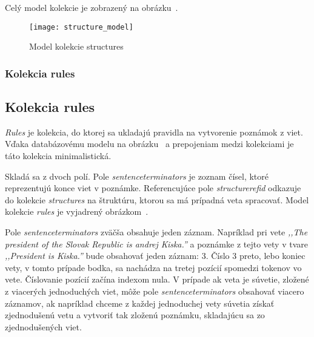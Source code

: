 Celý model kolekcie je zobrazený na obrázku~.

\begin{figure}[H]
	\begin{center}\texttt{[image: structure\_model]}\end{center}
	\caption[Model kolekcie structures]{Model kolekcie structures}\label{fig:structures_collection_model}
\end{figure}

%
%
{
	\subsubsection{Kolekcia rules}
}
{
	\subsection{Kolekcia rules}
}
\label{subsubsection:collection_rules}
\textit{Rules} je kolekcia, do ktorej sa ukladajú pravidla na vytvorenie poznámok z viet. Vďaka databázovému modelu na obrázku~ a prepojeniam medzi kolekciami je táto kolekcia minimalistická.

Skladá sa z dvoch polí. Pole \textit{sentence\textunderscore terminators} je zoznam čísel, ktoré reprezentujú konce viet v poznámke. Referencujúce pole \textit{structure\textunderscore ref\textunderscore id} odkazuje do kolekcie \textit{structures} na štruktúru, ktorou sa má prípadná veta spracovať. Model kolekcie \textit{rules} je vyjadrený obrázkom~.

Pole \textit{sentence\textunderscore terminators} zväčša obsahuje jeden záznam. Napríklad pri vete \textit{,,The president of the Slovak Republic is andrej Kiska.''} a poznámke z tejto vety v tvare \textit{,,President is Kiska.''} bude obsahovať jeden záznam: 3. Číslo 3 preto, lebo koniec vety, v tomto prípade bodka, sa nachádza na tretej pozícií spomedzi tokenov vo vete. Číslovanie pozícií začína indexom nula. V prípade ak veta je súvetie, zložené z viacerých jednoduchých viet, môže pole \textit{sentence\textunderscore terminators} obsahovať viacero záznamov, ak napríklad chceme z každej jednoduchej vety súvetia získať zjednodušenú vetu a vytvoriť tak zloženú poznámku, skladajúcu sa zo zjednodušených viet.


